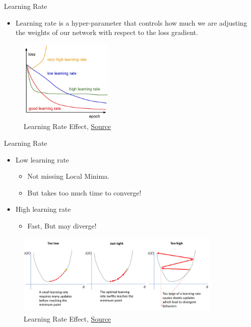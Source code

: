 \documentclass[compress,oilve,t]{beamer}
\begin{document}
\begin{frame}{Learning Rate}
	\begin{itemize}
		\item Learning rate is a hyper-parameter that controls how much we are adjusting the weights of our network with respect to the loss gradient. 
	\end{itemize}    
	\begin{figure}[H]
		\centering
		\includegraphics[width=0.4\textwidth]{Figs/lr.png}
		\caption{Learning Rate Effect, \href{https://medium.com/iitg-ai/into-the-depths-of-gradient-descent-52cf9ee92d36}{Source}}
	\end{figure}
\end{frame}

\begin{frame}{Learning Rate}
	\begin{itemize}
		\item Low learning rate 
		\begin{itemize}
			\item Not missing Local Minima.
			\item But takes too much time to converge!
		\end{itemize}
		\item High learning rate 
		\begin{itemize}
			\item Fast, But may diverge!
		\end{itemize}
	\end{itemize}  
	\begin{figure}
		\centering
		\includegraphics[width=10cm, height=4cm]{Figs/lr_high_res.jpg}
		\caption{Learning Rate Effect, \href{https://www.jeremyjordan.me/nn-learning-rate/}{Source}}
	\end{figure}
\end{frame}
\end{document}
